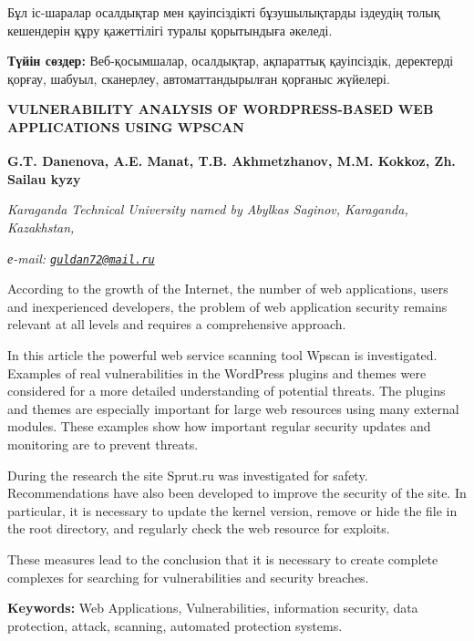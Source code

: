 Бұл іс-шаралар осалдықтар мен қауіпсіздікті бұзушылықтарды іздеудің
толық кешендерін құру қажеттілігі туралы қорытындыға әкеледі.

{\bfseries Түйін сөздер:} Веб-қосымшалар, осалдықтар, ақпараттық қауіпсіздік,
деректерді қорғау, шабуыл, сканерлеу, автоматтандырылған қорғаныс
жүйелері.

\begin{articleheader}
{\bfseries VULNERABILITY ANALYSIS OF WORDPRESS-BASED WEB APPLICATIONS USING WPSCAN}

{\bfseries
G.T. Danenova\textsuperscript{\envelope },
A.E. Manat,
T.B. Akhmetzhanov,
M.M. Kokkoz,
Zh. Sailau kyzy}
\end{articleheader}

\begin{affiliation}
\emph{Karaganda Technical University named by Abylkas Saginov, Karaganda, Kazakhstan,}

\emph{е-mail: \href{mailto:guldan72@mail.ru}{\nolinkurl{guldan72@mail.ru}}}
\end{affiliation}

According to the growth of the Internet, the number of web applications,
users and inexperienced developers, the problem of web application
security remains relevant at all levels and requires a comprehensive
approach.

In this article the powerful web service scanning tool Wpscan is
investigated. Examples of real vulnerabilities in the WordPress plugins
and themes were considered for a more detailed understanding of
potential threats. The plugins and themes are especially important for
large web resources using many external modules. These examples show how
important regular security updates and monitoring are to prevent
threats.

During the research the site Sprut.ru was investigated for safety.
Recommendations have also been developed to improve the security of the
site. In particular, it is necessary to update the kernel version,
remove or hide the file in the root directory, and regularly check the
web resource for exploits.

These measures lead to the conclusion that it is necessary to create
complete complexes for searching for vulnerabilities and security
breaches.

{\bfseries Keywords:} Web Applications, Vulnerabilities, information security, data
protection, attack, scanning, automated protection systems.

